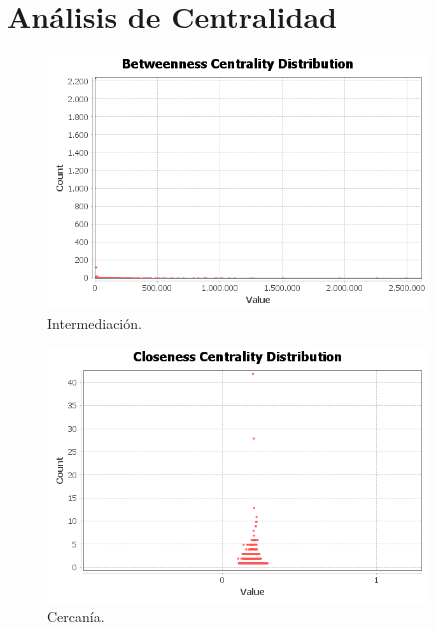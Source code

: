 \section{Análisis de Centralidad}

\begin{figure}[ht]
    \centerfloat
    \includegraphics[width=0.9\textwidth]{img/resultados/distanciaGrafo/Betweenness Centrality Distribution.png}
    \caption{Intermediación.}
\end{figure}

\begin{figure}[ht]
    \centerfloat
    \includegraphics[width=0.9\textwidth]{img/resultados/distanciaGrafo/Closeness Centrality Distribution.png}
    \caption{Cercanía.}
\end{figure}

